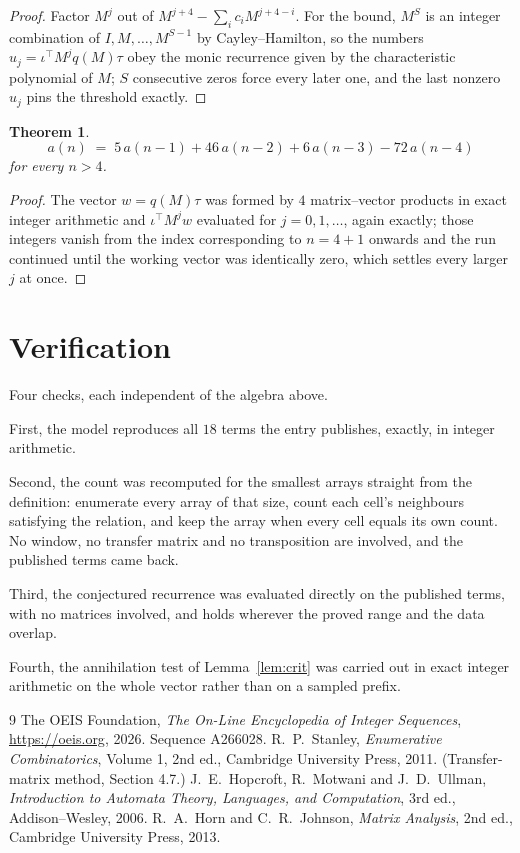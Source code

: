 \documentclass[11pt,a4paper]{article}
\theoremstyle{plain}
\newtheorem{theorem}{Theorem}
\theoremstyle{definition}
\begin{document}
\begin{proof}
Factor $M^{j}$ out of $M^{j+4}-\sum_ic_iM^{j+4-i}$. For the bound, $M^{S}$
is an integer combination of $I,M,\dots,M^{S-1}$ by Cayley--Hamilton, so the numbers
$u_j=\iota^{\!\top}M^{j}q(M)\tau$ obey the monic recurrence given by the characteristic
polynomial of $M$; $S$ consecutive zeros force every later one, and the last nonzero $u_j$
pins the threshold exactly.
\end{proof}

\begin{theorem}
\[
a(n)\;=\;5\,a(n-1) + 46\,a(n-2) + 6\,a(n-3) - 72\,a(n-4)
\]
for every $n>4$.
\end{theorem}

\begin{proof}
The vector $w=q(M)\tau$ was formed by $4$ matrix--vector products in exact integer
arithmetic and $\iota^{\!\top}M^{j}w$ evaluated for $j=0,1,\dots$, again exactly; those
integers vanish from the index corresponding to $n=4+1$ onwards and the run continued
until the working vector was identically zero, which settles every larger $j$ at once.
\end{proof}

\section{Verification}

Four checks, each independent of the algebra above.

First, the model reproduces all $18$ terms the entry publishes, exactly, in integer
arithmetic.

Second, the count was recomputed for the smallest arrays straight from the definition:
enumerate every array of that size, count each cell's neighbours satisfying the relation, and
keep the array when every cell equals its own count. No window, no transfer matrix and no
transposition are involved, and the published terms came back.

Third, the conjectured recurrence was evaluated directly on the published terms, with no
matrices involved, and holds wherever the proved range and the data overlap.

Fourth, the annihilation test of Lemma~\ref{lem:crit} was carried out in exact integer
arithmetic on the whole vector rather than on a sampled prefix.

\begin{thebibliography}{9}
 The OEIS Foundation, \emph{The On-Line Encyclopedia of Integer
Sequences}, \url{https://oeis.org}, 2026. Sequence A266028.
 R.~P.~Stanley, \emph{Enumerative Combinatorics}, Volume 1, 2nd ed.,
Cambridge University Press, 2011. (Transfer-matrix method, Section 4.7.)
 J.~E.~Hopcroft, R.~Motwani and J.~D.~Ullman, \emph{Introduction to Automata
Theory, Languages, and Computation}, 3rd ed., Addison--Wesley, 2006.
 R.~A.~Horn and C.~R.~Johnson, \emph{Matrix Analysis}, 2nd ed., Cambridge
University Press, 2013.
\end{thebibliography}
\end{document}

